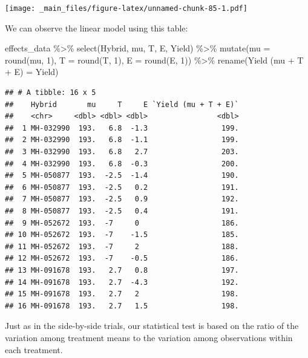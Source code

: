 \documentclass[
]{book}
\newenvironment{Shaded}{\begin{snugshade}}{\end{snugshade}}
\newcommand{\AttributeTok}[1]{\textcolor[rgb]{0.77,0.63,0.00}{#1}}
\newcommand{\DecValTok}[1]{\textcolor[rgb]{0.00,0.00,0.81}{#1}}
\newcommand{\FunctionTok}[1]{\textcolor[rgb]{0.00,0.00,0.00}{#1}}
\newcommand{\NormalTok}[1]{#1}
\newcommand{\OtherTok}[1]{\textcolor[rgb]{0.56,0.35,0.01}{#1}}
\newcommand{\SpecialCharTok}[1]{\textcolor[rgb]{0.00,0.00,0.00}{#1}}
\newcommand{\StringTok}[1]{\textcolor[rgb]{0.31,0.60,0.02}{#1}}
\begin{document}
\texttt{[image: \_main\_files/figure-latex/unnamed-chunk-85-1.pdf]}

We can observe the linear model using this table:

\begin{Shaded}
\begin{Highlighting}[]
\NormalTok{effects\_data }\SpecialCharTok{\%\textgreater{}\%}
  \FunctionTok{select}\NormalTok{(Hybrid, mu, T, E, Yield) }\SpecialCharTok{\%\textgreater{}\%}
  \FunctionTok{mutate}\NormalTok{(}\AttributeTok{mu =} \FunctionTok{round}\NormalTok{(mu, }\DecValTok{1}\NormalTok{),}
         \AttributeTok{T =} \FunctionTok{round}\NormalTok{(T, }\DecValTok{1}\NormalTok{),}
         \AttributeTok{E =} \FunctionTok{round}\NormalTok{(E, }\DecValTok{1}\NormalTok{)) }\SpecialCharTok{\%\textgreater{}\%}
  \FunctionTok{rename}\NormalTok{(}\StringTok{\textasciigrave{}}\AttributeTok{Yield (mu + T + E)}\StringTok{\textasciigrave{}} \OtherTok{=}\NormalTok{ Yield)}
\end{Highlighting}
\end{Shaded}

\begin{verbatim}
## # A tibble: 16 x 5
##    Hybrid       mu     T     E `Yield (mu + T + E)`
##    <chr>     <dbl> <dbl> <dbl>                <dbl>
##  1 MH-032990  193.   6.8  -1.3                 199.
##  2 MH-032990  193.   6.8  -1.1                 199.
##  3 MH-032990  193.   6.8   2.7                 203.
##  4 MH-032990  193.   6.8  -0.3                 200.
##  5 MH-050877  193.  -2.5  -1.4                 190.
##  6 MH-050877  193.  -2.5   0.2                 191.
##  7 MH-050877  193.  -2.5   0.9                 192.
##  8 MH-050877  193.  -2.5   0.4                 191.
##  9 MH-052672  193.  -7     0                   186.
## 10 MH-052672  193.  -7    -1.5                 185.
## 11 MH-052672  193.  -7     2                   188.
## 12 MH-052672  193.  -7    -0.5                 186.
## 13 MH-091678  193.   2.7   0.8                 197.
## 14 MH-091678  193.   2.7  -4.3                 192.
## 15 MH-091678  193.   2.7   2                   198.
## 16 MH-091678  193.   2.7   1.5                 198.
\end{verbatim}

Just as in the side-by-side trials, our statistical test is based on the ratio of the variation among treatment means to the variation among observations within each treatment.
\end{document}
